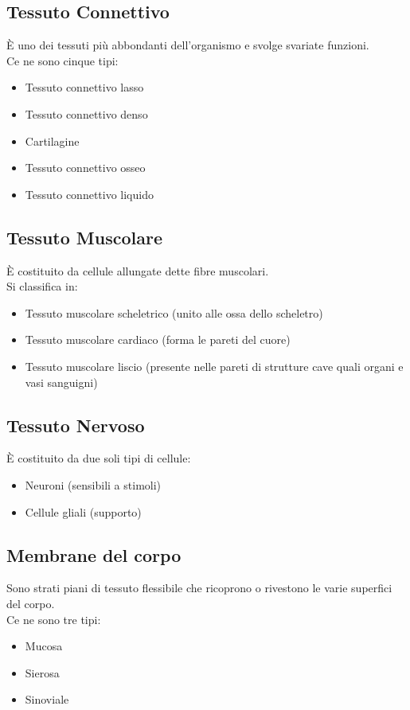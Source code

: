 \documentclass[a4paper]{article}
\begin{document}
\subsection{Tessuto Connettivo}
È uno dei tessuti più abbondanti dell’organismo e svolge svariate funzioni. \\
Ce ne sono cinque tipi:
\begin{itemize}
    \item Tessuto connettivo lasso
    \item Tessuto connettivo denso
    \item Cartilagine
    \item Tessuto connettivo osseo
    \item Tessuto connettivo liquido
\end{itemize}
\subsection{Tessuto Muscolare}
È costituito da cellule allungate dette fibre muscolari. \\
Si classifica in: 
\begin{itemize}
\item Tessuto muscolare scheletrico (unito alle ossa dello scheletro)
\item Tessuto muscolare cardiaco (forma le pareti del cuore)
\item Tessuto muscolare liscio (presente nelle pareti di strutture cave quali 
organi e vasi sanguigni)
\end{itemize}
\subsection{Tessuto Nervoso}
È costituito da due soli tipi di cellule:
\begin{itemize}
    \item Neuroni (sensibili a stimoli)
    \item Cellule gliali (supporto)
\end{itemize}
\subsection{Membrane del corpo}
Sono strati piani di tessuto flessibile che ricoprono o rivestono le varie 
superfici del corpo. \\
Ce ne sono tre tipi:
\begin{itemize}
    \item Mucosa
    \item Sierosa
    \item Sinoviale
\end{itemize}
\end{document}
